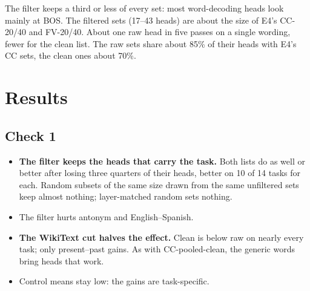 \documentclass[10pt,a4paper]{article}
\begin{document}
The filter keeps a third or less of every set: most word-decoding heads look mainly at BOS. The filtered sets (17--43 heads) are about the size of E4's CC-20/40 and FV-20/40. About one raw head in five passes on a single wording, fewer for the clean list. The raw sets share about 85\% of their heads with E4's CC sets, the clean ones about 70\%.

\section{Results}

\subsection{Check 1}

\begin{table}[H]\centering\small
\resizebox{\linewidth}{!}{}
\caption{Check 1, task accuracy at the cross-fitted $\alpha$, mean of the two folds. $+$F = BOS filter; drop / layer = random-drop and layer-matched random (mean of 5 draws, at the $\alpha$ of the filtered set). Items: patched items in fold 1/2. Control mean: accuracy with the control task's mean.}
\label{tab:check1}
\end{table}

\begin{itemize}
\item \textbf{The filter keeps the heads that carry the task.} Both lists do as well or better after losing three quarters of their heads, better on 10 of 14 tasks for each. Random subsets of the same size drawn from the same unfiltered sets keep almost nothing; layer-matched random sets nothing.
\item The filter hurts antonym and English--Spanish.
\item \textbf{The WikiText cut halves the effect.} Clean is below raw on nearly every task; only present--past gains. As with CC-pooled-clean, the generic words bring heads that work.
\item Control means stay low: the gains are task-specific.
\end{itemize}

\begin{table}[H]\centering\small
\resizebox{\linewidth}{!}{}
\caption{Check 1, raw $+$F against E4's sets on the same items: CC (CC-pooled, $\sim$120 heads), CC and FV ranked sets of 20 and 40 heads, and FV-$N_t$ (as many FV-ranked heads as CC).}
\label{tab:refs}
\end{table}
\end{document}
